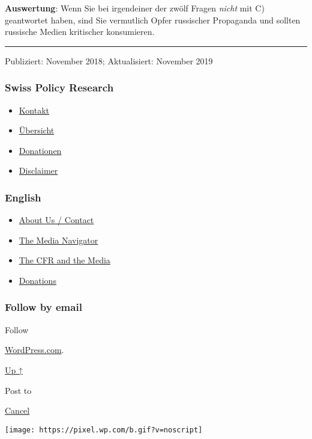 \textbf{Auswertung}: Wenn Sie bei irgendeiner der zwölf Fragen
\emph{nicht} mit C) geantwortet haben, sind Sie vermutlich Opfer
russischer Propaganda und sollten russische Medien kritischer
konsumieren.

\begin{center}\rule{0.5\linewidth}{\linethickness}\end{center}

Publiziert: November 2018; Aktualisiert: November 2019

\hypertarget{swiss-policy-research}{%
\subsubsection{Swiss Policy Research}\label{swiss-policy-research}}

\begin{itemize}
\tightlist
\item
  \href{https://swprs.org/kontakt/}{Kontakt}
\item
  \href{https://swprs.org/uebersicht/}{Übersicht}
\item
  \href{https://swprs.org/donationen/}{Donationen}
\item
  \href{https://swprs.org/disclaimer/}{Disclaimer}
\end{itemize}

\hypertarget{english}{%
\subsubsection{English}\label{english}}

\begin{itemize}
\tightlist
\item
  \href{https://swprs.org/contact/}{About Us / Contact}
\item
  \href{https://swprs.org/media-navigator/}{The Media Navigator}
\item
  \href{https://swprs.org/the-american-empire-and-its-media/}{The CFR
  and the Media}
\item
  \href{https://swprs.org/donations/}{Donations}
\end{itemize}

\hypertarget{follow-by-email}{%
\subsubsection{Follow by email}\label{follow-by-email}}

Follow

\href{https://wordpress.com/?ref=footer_custom_com}{WordPress.com}.

\protect\hyperlink{}{Up ↑}

Post to

\protect\hyperlink{}{Cancel}

\texttt{[image: https://pixel.wp.com/b.gif?v=noscript]}
